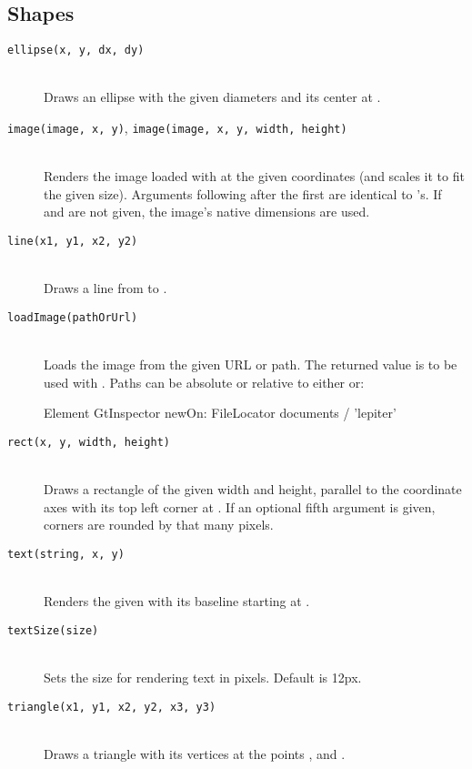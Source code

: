 \subsection{Shapes}
\begin{description}
\item[\texttt{ellipse(x, y, dx, dy)}] \hfill \\
	Draws an ellipse with the given diameters and its center at .
\item[\texttt{image(image, x, y)}, \texttt{image(image, x, y, width, height)}] \hfill \\
	Renders the image loaded with  at the given coordinates (and scales it to fit the given size). Arguments following after the first are identical to 's. If  and  are not given, the image's native dimensions are used.
\item[\texttt{line(x1, y1, x2, y2)}] \hfill \\
	Draws a line from  to .
\item[\texttt{loadImage(pathOrUrl)}] \hfill \\
	Loads the image from the given URL or path. The returned value is to be used with .
Paths can be absolute or relative to either  or:
\begin{code}
Element
GtInspector newOn: FileLocator documents / 'lepiter'
\end{code}
\item[\texttt{rect(x, y, width, height)}] \hfill \\
	Draws a rectangle of the given width and height, parallel to the coordinate axes with its top left corner at . If an optional fifth argument is given, corners are rounded by that many pixels.
\item[\texttt{text(string, x, y)}] \hfill \\
	Renders the given  with its baseline starting at .
\item[\texttt{textSize(size)}] \hfill \\
	Sets the size for rendering text in pixels. Default is 12px.
\item[\texttt{triangle(x1, y1, x2, y2, x3, y3)}] \hfill \\
	Draws a triangle with its vertices at the points ,  and .
\end{description}

